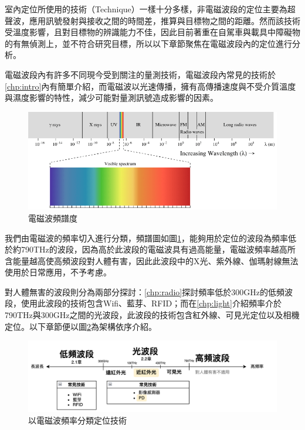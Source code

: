     室內定位所使用的技術（Technique）一樣十分多樣，非電磁波段的定位主要為超聲波，應用訊號發射與接收之間的時間差，推算與目標物之間的距離。然而該技術受溫度影響，且對目標物的辨識能力不佳，因此目前著重在自駕車與載具中障礙物的有無偵測上\cite{survey_ultrasonic}，並不符合研究目標，所以以下章節聚焦在電磁波段內的定位進行分析。

    電磁波段內有許多不同現今受到關注的量測技術，電磁波段內常見的技術於\ref{chp:intro}內有簡單介紹，而電磁波以光速傳播，擁有高傳播速度與不受介質溫度與濕度影響的特性，減少可能對量測訊號造成影響的因素。

    \begin{figure}[ht]
        \centering
        \includegraphics[width=12cm]{ch2pic/electro_spectrum.png}
        \caption{電磁波頻譜度\cite{Spectrum}}
        \label{pic:spectrum}
    \end{figure}

    我們由電磁波的頻率切入進行分類，頻譜圖如圖\ref{pic:spectrum}，能夠用於定位的波段為頻率低於約790THz的波段，因為高於此波段的電磁波具有過高能量，電磁波頻率越高所含能量越高使高頻波段對人體有害，因此此波段中的X光、紫外線、伽瑪射線無法使用於日常應用，不予考慮。

    對人體無害的波段則分為兩部分探討：\ref{chp:radio}探討頻率低於300GHz的低頻波段\cite{book_electromagnetic}，使用此波段的技術包含Wifi、藍芽、RFID；而在\ref{chp:light}介紹頻率介於790THz與300GHz之間的光波段，此波段的技術包含紅外線、可見光定位以及相機定位。以下章節便以圖\ref{pic:electro_sort}為架構依序介紹。


    \begin{figure}[ht]
        \centering
        \includegraphics[width=13cm]{ch2pic/electro_sort.png}
        \caption{以電磁波頻率分類定位技術}
        \label{pic:electro_sort}
    \end{figure}


